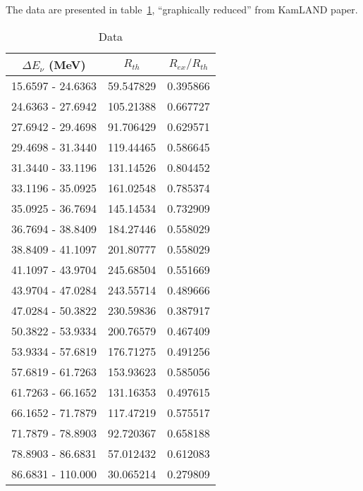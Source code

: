 \documentclass[12pt]{article}
\begin{document}
The data are presented in table~\ref{tab:data}, ``graphically reduced'' from KamLAND paper.

\begin{table}[h!]
  \begin{center}
    \caption{Data}
    \label{tab:data}
    \begin{tabular}{c|c|c}
      \hline
      $\Delta E_\nu$ (MeV) &     $R_{th}$    & $R_{ex}/R_{th}$ \\
      \hline
      15.6597 - 24.6363 &     59.547829 &       0.395866 \\
      24.6363 - 27.6942 &     105.21388 &       0.667727 \\
      27.6942 - 29.4698 &     91.706429 &       0.629571 \\
      29.4698 - 31.3440 &     119.44465 &       0.586645 \\
      31.3440 - 33.1196 &     131.14526 &       0.804452 \\
      33.1196 - 35.0925 &     161.02548 &       0.785374 \\
      35.0925 - 36.7694 &     145.14534 &       0.732909 \\
      36.7694 - 38.8409 &     184.27446 &       0.558029 \\
      38.8409 - 41.1097 &     201.80777 &       0.558029 \\
      41.1097 - 43.9704 &     245.68504 &       0.551669 \\
      43.9704 - 47.0284 &     243.55714 &       0.489666 \\
      47.0284 - 50.3822 &     230.59836 &       0.387917 \\
      50.3822 - 53.9334 &     200.76579 &       0.467409 \\
      53.9334 - 57.6819 &     176.71275 &       0.491256 \\
      57.6819 - 61.7263 &     153.93623 &       0.585056 \\
      61.7263 - 66.1652 &     131.16353 &       0.497615 \\
      66.1652 - 71.7879 &     117.47219 &       0.575517 \\
      71.7879 - 78.8903 &     92.720367 &       0.658188 \\
      78.8903 - 86.6831 &     57.012432 &       0.612083 \\
      86.6831 - 110.000 &     30.065214 &       0.279809 \\
      \hline
    \end{tabular}
  \end{center}
\end{table}
\end{document}
